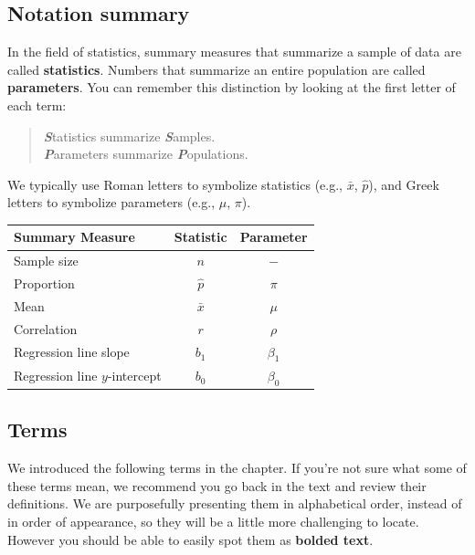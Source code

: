 \documentclass[
  10pt,
  openany]{book}
\theoremstyle{definition}
\theoremstyle{definition}
\theoremstyle{definition}
\theoremstyle{definition}
\theoremstyle{remark}
\begin{document}
\subsection*{Notation summary}\label{notation-summary}

In the field of statistics, summary measures that summarize a sample of data are called \textbf{statistics}. Numbers that summarize an entire population are called \textbf{parameters}. You can remember
this distinction by looking at the first letter of each term:

\begin{quote}
\textbf{\emph{S}}tatistics summarize \textbf{\emph{S}}amples.\\
\textbf{\emph{P}}arameters summarize \textbf{\emph{P}}opulations.
\end{quote}

We typically use Roman letters to symbolize statistics (e.g., \(\bar{x}\), \(\hat{p}\)), and Greek letters to symbolize parameters (e.g., \(\mu\), \(\pi\)).

{\def\LTcaptype{none} %
\begin{longtable}[]{@{}lcc@{}}
\toprule\noalign{}
Summary Measure & Statistic & Parameter \\
\midrule\noalign{}
\endhead
\bottomrule\noalign{}
\endlastfoot
Sample size & \(n\) & \(-\) \\
Proportion & \(\hat{p}\) & \(\pi\) \\
Mean & \(\bar{x}\) & \(\mu\) \\
Correlation & \(r\) & \(\rho\) \\
Regression line slope & \(b_1\) & \(\beta_1\) \\
Regression line \(y\)-intercept & \(b_0\) & \(\beta_0\) \\
\end{longtable}
}

\subsection*{Terms}\label{terms-5}

We introduced the following terms in the chapter.
If you're not sure what some of these terms mean, we recommend you go back in the text and review their definitions.
We are purposefully presenting them in alphabetical order, instead of in order of appearance, so they will be a little more challenging to locate.
However you should be able to easily spot them as \textbf{bolded text}.
\end{document}
